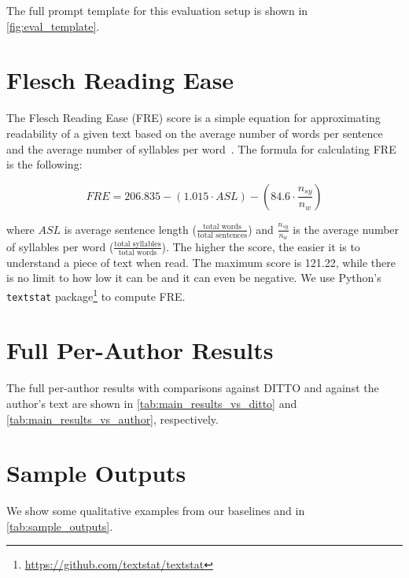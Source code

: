 The full prompt template for this evaluation setup is shown in \autoref{fig:eval_template}. 













\section{Flesch Reading Ease}
\label{appdx:flesch}

The Flesch Reading Ease (FRE) score is a simple equation for approximating readability of a given text based on the average number of words per sentence and the average number of syllables per word~\cite{flesch1948new}.
The formula for calculating FRE is the following: 

$$
FRE= 206.835 - (1.015\cdot ASL)-(84.6\cdot \frac{n_{sy}}{n_w})
$$

where $ASL$ is average sentence length ($\frac{\text{total words}}{\text{total sentences}}$) and $\frac{n_{sy}}{n_w}$ is the average number of syllables per word ($\frac{\text{total syllables}}{\text{total words}}$).  
The higher the score, the easier it is to understand a piece of text when read. 
The maximum score is 121.22, while there is no limit to how low it can be and it can even be negative. 
We use Python's \texttt{textstat} package\footnote{\url{https://github.com/textstat/textstat}} to compute FRE. 





\section{Full Per-Author Results}

The full per-author results with comparisons against DITTO and against the author's text are shown in \autoref{tab:main_results_vs_ditto} and \autoref{tab:main_results_vs_author}, respectively.

\section{Sample Outputs}

We show some qualitative examples from our baselines and \ours in \autoref{tab:sample_outputs}. 




